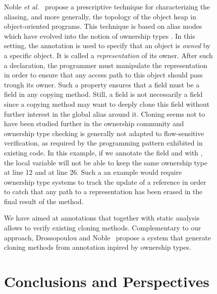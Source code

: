 \documentclass{LMCS}
\newcommand{\ttt}[1]{}
\begin{document}
\begin{figure}
Noble \emph{et al.}~\cite{Noble:98:Flexible} propose a prescriptive
technique for characterizing the aliasing, and more generally, the
topology of the object heap in object-oriented programs. This
technique is based on alias modes which have evolved into the notion
of ownership types \cite{Clarke:98:Ownership}. In this setting, the
annotation \ttt{@Repr} is used to specify that an object is
\emph{owned} by a specific object. It is called a
\emph{representation} of its owner. After such a declaration, the
programmer must manipulate the representation in order to ensure that
any access path to this object should pass trough its owner. Such a
property ensures that a \ttt{@Repr} field must be a \ttt{@Deep}
field in any copying method. Still, a \ttt{@Deep} field is not
necessarily a \ttt{@Repr} field since a copying method may want to
deeply clone this field without further interest in the global alias
around it.  Cloning seems not to have been studied further in the
ownership community and ownership type checking is generally not
adapted to flow-sensitive verification, as required by the programming
pattern exhibited in existing code. In this example, if we annotate
the field \ttt{next} and \ttt{previous} with \ttt{@Repr}, the
\ttt{clone} local variable will not be able to keep the same
ownership type at line 12 and at line 26. Such a an example would
require ownership type systems to track the update of a reference in
order to catch that any path to a representation has been erased in
the final result of the method.

We have aimed at annotations that together with static
analysis allows to verify existing cloning methods. 
Complementary to our approach, 
Drossopoulou and Noble~\cite{pubsdoc:clonesPre} propose a system
that generate cloning methods from annotation inpired by ownership types.


\section{Conclusions and Perspectives}


\end{figure}
\end{document}
